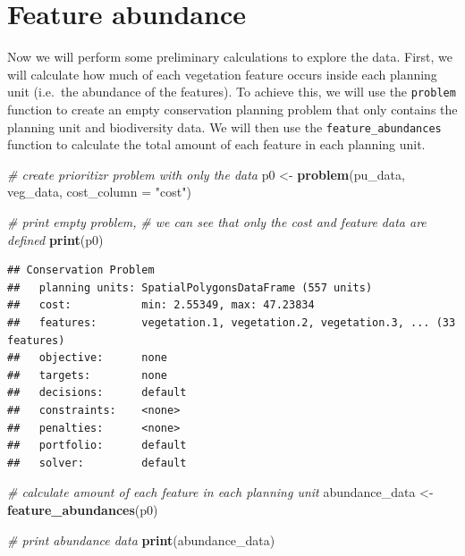 \documentclass[12pt,]{book}
\newenvironment{Shaded}{\begin{snugshade}}{\end{snugshade}}
\newcommand{\KeywordTok}[1]{\textcolor[rgb]{0.13,0.29,0.53}{\textbf{#1}}}
\newcommand{\DataTypeTok}[1]{\textcolor[rgb]{0.13,0.29,0.53}{#1}}
\newcommand{\StringTok}[1]{\textcolor[rgb]{0.31,0.60,0.02}{#1}}
\newcommand{\CommentTok}[1]{\textcolor[rgb]{0.56,0.35,0.01}{\textit{#1}}}
\newcommand{\NormalTok}[1]{#1}
\begin{document}
\section{Feature abundance}\label{feature-abundance}

Now we will perform some preliminary calculations to explore the data.
First, we will calculate how much of each vegetation feature occurs
inside each planning unit (i.e.~the abundance of the features). To
achieve this, we will use the \texttt{problem} function to create an
empty conservation planning problem that only contains the planning unit
and biodiversity data. We will then use the \texttt{feature\_abundances}
function to calculate the total amount of each feature in each planning
unit.

\begin{Shaded}
\begin{Highlighting}[]
\CommentTok{# create prioritizr problem with only the data}
\NormalTok{p0 <-}\StringTok{ }\KeywordTok{problem}\NormalTok{(pu_data, veg_data, }\DataTypeTok{cost_column =} \StringTok{"cost"}\NormalTok{)}

\CommentTok{# print empty problem,}
\CommentTok{# we can see that only the cost and feature data are defined}
\KeywordTok{print}\NormalTok{(p0)}
\end{Highlighting}
\end{Shaded}

\begin{verbatim}
## Conservation Problem
##   planning units: SpatialPolygonsDataFrame (557 units)
##   cost:           min: 2.55349, max: 47.23834
##   features:       vegetation.1, vegetation.2, vegetation.3, ... (33 features)
##   objective:      none
##   targets:        none
##   decisions:      default
##   constraints:    <none>
##   penalties:      <none>
##   portfolio:      default
##   solver:         default
\end{verbatim}

\begin{Shaded}
\begin{Highlighting}[]
\CommentTok{# calculate amount of each feature in each planning unit}
\NormalTok{abundance_data <-}\StringTok{ }\KeywordTok{feature_abundances}\NormalTok{(p0)}

\CommentTok{# print abundance data}
\KeywordTok{print}\NormalTok{(abundance_data)}
\end{Highlighting}
\end{Shaded}
\end{document}
